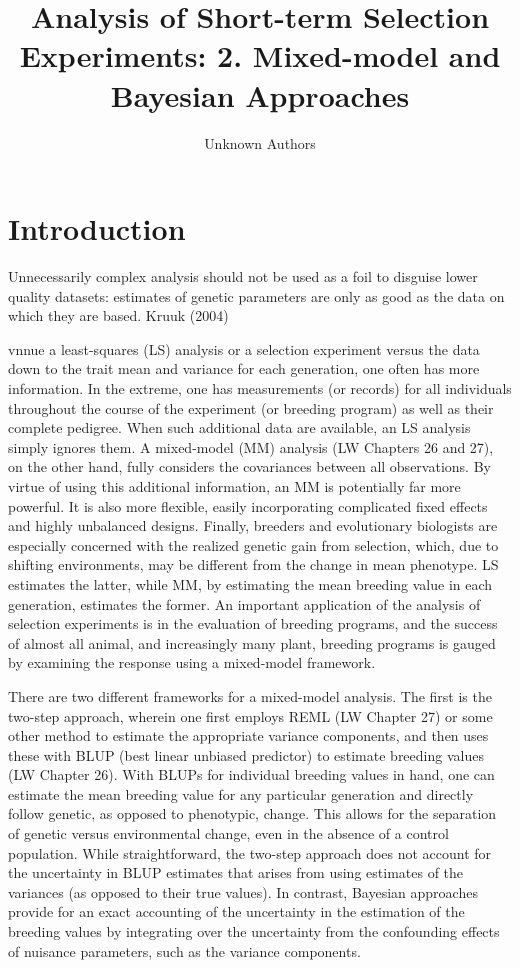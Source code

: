 \documentclass{article}
\title{Analysis of Short-term Selection Experiments:
2. Mixed-model and Bayesian Approaches}
\author{Unknown Authors}
\date{}
\begin{document}
\maketitle

\begin{abstract}

\end{abstract}

\section{Introduction}
Unnecessarily complex analysis should not be used as a foil to disguise lower quality datasets: estimates of genetic parameters are only as good as the data on which they are based.
Kruuk (2004)

vnnue a least-squares (LS) analysis or a selection experiment versus the data down to the trait mean and variance for each generation, one often has more information. In the extreme, one has measurements (or records) for all individuals throughout the course of the experiment (or breeding program) as well as their complete pedigree. When such additional data are available, an LS analysis simply ignores them. A mixed-model (MM) analysis (LW Chapters 26 and 27), on the other hand, fully considers the covariances between all observations. By virtue of using this additional information, an MM is potentially far more powerful. It is also more flexible, easily incorporating complicated fixed effects and highly unbalanced designs. Finally, breeders and evolutionary biologists are especially concerned with the realized genetic gain from selection, which, due to shifting environments, may be different from the change in mean phenotype. LS estimates the latter, while MM, by estimating the mean breeding value in each generation, estimates the former. An important application of the analysis of selection experiments is in the evaluation of breeding programs, and the success of almost all animal, and increasingly many plant, breeding programs is gauged by examining the response using a mixed-model framework.

There are two different frameworks for a mixed-model analysis. The first is the two-step approach, wherein one first employs REML (LW Chapter 27) or some other method to estimate the appropriate variance components, and then uses these with BLUP (best linear unbiased predictor) to estimate breeding values (LW Chapter 26). With BLUPs for individual breeding values in hand, one can estimate the mean breeding value for any particular generation and directly follow genetic, as opposed to phenotypic, change. This allows for the separation of genetic versus environmental change, even in the absence of a control population. While straightforward, the two-step approach does not account for the uncertainty in BLUP estimates that arises from using estimates of the variances (as opposed to their true values). In contrast, Bayesian approaches provide for an exact accounting of the uncertainty in the estimation of the breeding values by integrating over the uncertainty from the confounding effects of nuisance parameters, such as the variance components.
\end{document}

